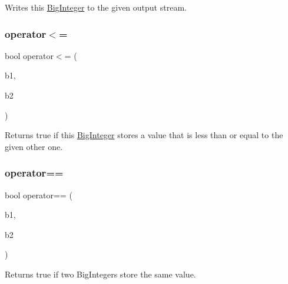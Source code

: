 Writes this \mbox{\hyperlink{classBigInteger}{Big\+Integer}} to the given output stream. 

\mbox{\label{classBigInteger_a73169242c1907d12830fe4110a5e2704}} 
\subsubsection{\texorpdfstring{operator$<$=}{operator<=}}
{\footnotesize\ttfamily bool operator$<$= (\begin{DoxyParamCaption}\item[{const \mbox{\hyperlink{classBigInteger}{Big\+Integer}} \&}]{b1,  }\item[{const \mbox{\hyperlink{classBigInteger}{Big\+Integer}} \&}]{b2 }\end{DoxyParamCaption})\hspace{0.3cm}{\ttfamily [friend]}}



Returns true if this \mbox{\hyperlink{classBigInteger}{Big\+Integer}} stores a value that is less than or equal to the given other one. 

\mbox{\label{classBigInteger_acdbc3e3ed5ef2535a628df89780d0a9b}} 
\subsubsection{\texorpdfstring{operator==}{operator==}}
{\footnotesize\ttfamily bool operator== (\begin{DoxyParamCaption}\item[{const \mbox{\hyperlink{classBigInteger}{Big\+Integer}} \&}]{b1,  }\item[{const \mbox{\hyperlink{classBigInteger}{Big\+Integer}} \&}]{b2 }\end{DoxyParamCaption})\hspace{0.3cm}{\ttfamily [friend]}}



Returns true if two Big\+Integers store the same value. 

\mbox{\label{classBigInteger_a6a9bb9ae99920398555f337f66044594}} 
